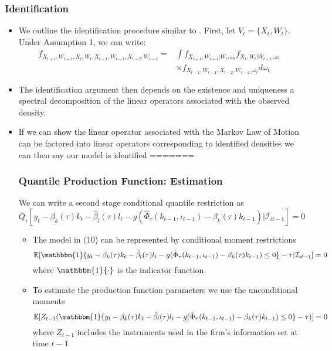 \documentclass{beamer}
\begin{document}
\begin{frame}
\begin{itemize}
\begin{frame}
\frametitle{Identification}
\begin{itemize}
\item We outline the identification procedure similar to \cite{Hu2012}. First, let $V_{t}=\{X_{t}, W_{t}\}$. Under Assumption 1, we can write:
 \begin{equation}\label{obsdens}
 \begin{split}
 f_{X_{t+1}, W_{t+1}, X_{t}, W_{t}, X_{t-1}, W_{t-1}, X_{t-2}, W_{t-2}}=&\int f_{X_{t+1},W_{t+1}|W_{t},\omega_{t}}f_{X_{t}, W_{t}|W_{t-1},\omega_{t}}\\
 &\times f_{X_{t-1}, W_{t-1}, X_{t-2}, W_{t-2}, \omega_{t}}d\omega_{t}
 \end{split}
 \end{equation}
 \item The identification argument then depends on the existence and uniqueness a spectral decomposition of the linear operators associated with the observed density. 
 \item If we can show the linear operator associated with the Markov Law of Motion can be factored into linear operators corresponding to identified densities we can then say our model is identified
=======

\begin{frame}
\frametitle{Quantile Production Function: Estimation}
We can write a second stage conditional quantile restriction as
\small
\begin{equation}
Q_{\tau}[y_{t}-\beta_{k}(\tau)k_{t}-\hat{\beta}_{l}(\tau)l_{t}-g(\hat{\Phi}_{\tau}(k_{t-1}, \iota_{t-1})-\beta_{k}(\tau)k_{t-1})|\mathcal{I}_{it-1}]=0
\end{equation}
\normalsize

\begin{itemize}
	\item The model in (10) can be represented by conditional moment restrictions
	\small
	\begin{equation}
	\mathbb{E}[\mathbbm{1}\{y_{t}-\beta_{k}(\tau)k_{t}-\hat{\beta}_{l}(\tau)l_{t}-g(\hat{\Phi}_{\tau}(k_{t-1}, \iota_{t-1})-\beta_{k}(\tau)k_{t-1})\leq 0\}-\tau|\mathcal{I}_{it-1}]=0
	\end{equation}
	\normalsize
	where $\mathbbm{1}\{\cdot\}$ is the indicator function
	
	\item To estimate the production function parameters we use the unconditional moments
	\small
	\begin{equation}
	\mathbb{E}[Z_{t-1}(\mathbbm{1}\{y_{t}-\beta_{k}(\tau)k_{t}-\hat{\beta}_{l}(\tau)l_{t}-g(\hat{\Phi}_{\tau}(k_{t-1}, \iota_{t-1})-\beta_{k}(\tau)k_{t-1})\leq 0\}-\tau)]=0
	\end{equation}
	\normalsize
	where $Z_{t-1}$ includes the instruments used in the firm's information set at time $t-1$
\end{itemize}
	

\end{frame}
\end{itemize}
\end{frame}
\end{itemize}
\end{frame}
\end{document}
